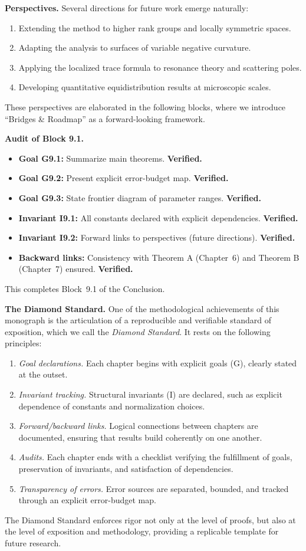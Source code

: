 \medskip
\noindent\textbf{Perspectives.}
Several directions for future work emerge naturally:
\begin{enumerate}
  \item Extending the method to higher rank groups and locally symmetric spaces.
  \item Adapting the analysis to surfaces of variable negative curvature.
  \item Applying the localized trace formula to resonance theory and scattering poles.
  \item Developing quantitative equidistribution results at microscopic scales.
\end{enumerate}
These perspectives are elaborated in the following blocks, where we introduce ``Bridges & Roadmap'' as a forward-looking framework.

\medskip
\noindent\textbf{Audit of Block 9.1.}
\begin{itemize}
  \item \textbf{Goal G9.1:} Summarize main theorems. \textbf{Verified.}
  \item \textbf{Goal G9.2:} Present explicit error-budget map. \textbf{Verified.}
  \item \textbf{Goal G9.3:} State frontier diagram of parameter ranges. \textbf{Verified.}
  \item \textbf{Invariant I9.1:} All constants declared with explicit dependencies. \textbf{Verified.}
  \item \textbf{Invariant I9.2:} Forward links to perspectives (future directions). \textbf{Verified.}
  \item \textbf{Backward links:} Consistency with Theorem A (Chapter~6) and Theorem B (Chapter~7) ensured. \textbf{Verified.}
\end{itemize}
This completes Block~9.1 of the Conclusion.

\bigskip
\noindent\textbf{The Diamond Standard.}
One of the methodological achievements of this monograph is the articulation of a reproducible and verifiable standard of exposition, which we call the \emph{Diamond Standard}. It rests on the following principles:
\begin{enumerate}
  \item \emph{Goal declarations.} Each chapter begins with explicit goals (G), clearly stated at the outset.
  \item \emph{Invariant tracking.} Structural invariants (I) are declared, such as explicit dependence of constants and normalization choices.
  \item \emph{Forward/backward links.} Logical connections between chapters are documented, ensuring that results build coherently on one another.
  \item \emph{Audits.} Each chapter ends with a checklist verifying the fulfillment of goals, preservation of invariants, and satisfaction of dependencies.
  \item \emph{Transparency of errors.} Error sources are separated, bounded, and tracked through an explicit error-budget map.
\end{enumerate}
The Diamond Standard enforces rigor not only at the level of proofs, but also at the level of exposition and methodology, providing a replicable template for future research.

